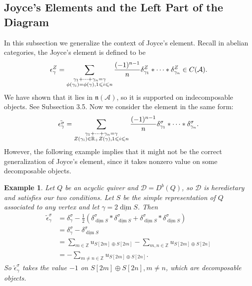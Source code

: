 \documentclass[a4paper,12pt]{amsart}
\newtheorem{example}[theorem]{Example}
\newcommand{\udv}{\underline{\dim}}
\begin{document}
\subsection{Joyce's Elements and the Left Part of the Diagram}
In this subsection we generalize the context of Joyce's element. Recall in abelian categories, the Joyce's element is defined to be
\[\epsilon^Z_\gamma=\sum_{\begin{subarray}{c}
    \\ \gamma_1+\dots+\gamma_n=\gamma\\ \phi(\gamma_i)=\phi(\gamma),1\leqslant i\leqslant n
\end{subarray}}\frac{(-1)^{n-1}}{n}\delta^Z_{\gamma_1}*\dots*\delta^Z_{\gamma_n}\in C(\mathcal{A}).\]
We have shown that it lies in $\mathfrak{n}(\mathcal{A})$, so it is supported on indecomposable objects. See Subsection 3.5. Now we consider the element in the same form:
\[\tilde{\epsilon^\sigma_\gamma}=\sum_{\begin{subarray}{c}
        \\ \gamma_1+\dots+\gamma_n=\gamma\\
        Z(\gamma_i)\in\mathbb{R}_+Z(\gamma),1\leqslant i\leqslant n
    \end{subarray}}\frac{(-1)^{n-1}}{n}\delta^\sigma_{\gamma_1}*\dots*\delta^\sigma_{\gamma_n}.\]
However, the following example implies that it might not be the correct generalization of Joyce's element, since it takes nonzero value on some decomposable objects.
\begin{example}
    Let $Q$ be an acyclic quiver and $\mathcal{D}=D^b(Q)$, so $\mathcal{D}$ is heredietary and satisfies our two conditions. Let $S$ be the simple representation of $Q$ associated to any vertex and let $\gamma=2\udv S$. Then
    \begin{align*}
        \tilde{\epsilon}^\sigma_\gamma&=\delta^\sigma_\gamma-\frac12(\delta^\sigma_{\udv S}*\delta^\sigma_{\udv S}+\delta^\sigma_{\udv S}*\delta^\sigma_{\udv S})\\
        &=\delta^\sigma_\gamma-\delta^\sigma_{\udv S}\\
        &=\sum_{m\in\mathbb{Z}}u_{S[2m]\oplus S[2m]}-\sum_{m,n\in\mathbb{Z}}u_{S[2m]\oplus S[2n]}\\
        &=-\sum_{m\neq n\in\mathbb{Z}}u_{S[2m]\oplus S[2n]}.
        \end{align*}
    So $\tilde{\epsilon}^\sigma_\gamma$ takes the value $-1$ on $S[2m]\oplus S[2n],m\neq n$, which are decomposable objects.
\end{example}
\end{document}
